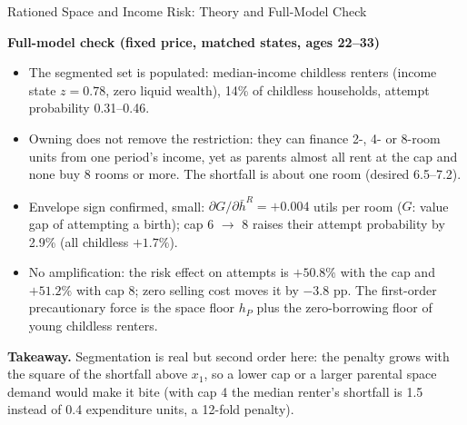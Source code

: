 \documentclass[11pt,aspectratio=169]{beamer}
\newcommand{\1}{\mathbf 1}
\newcommand{\takeaway}[1]{\vfill{\small\textbf{Takeaway.} #1}}
\begin{document}
\begin{frame}[t]{Rationed Space and Income Risk: Theory and Full-Model Check}
\begin{minipage}[t]{0.62\textwidth}
\vspace{0pt}
\scriptsize\setlength{\leftmargini}{1em}
\textbf{Full-model check (fixed price, matched states, ages 22--33)}
\begin{itemize}\setlength{\itemsep}{0.1em}\setlength{\parskip}{0pt}
\item The segmented set is populated: median-income childless renters (income state $z=0.78$, zero liquid wealth), 14\% of childless households, attempt probability 0.31--0.46.
\item Owning does not remove the restriction: they can finance 2-, 4- or 8-room units from one period's income, yet as parents almost all rent at the cap and none buy 8 rooms or more. The shortfall is about one room (desired 6.5--7.2).
\item Envelope sign confirmed, small: $\partial G/\partial \bar h^R = +0.004$ utils per room ($G$: value gap of attempting a birth); cap 6 $\to$ 8 raises their attempt probability by 2.9\% (all childless $+1.7\%$).
\item No amplification: the risk effect on attempts is $+50.8\%$ with the cap and $+51.2\%$ with cap 8; zero selling cost moves it by $-3.8$ pp. The first-order precautionary force is the space floor $h_P$ plus the zero-borrowing floor of young childless renters.
\end{itemize}
\end{minipage}

\takeaway{\scriptsize Segmentation is real but second order here: the penalty grows with the square of the shortfall above $x_1$, so a lower cap or a larger parental space demand would make it bite (with cap 4 the median renter's shortfall is 1.5 instead of 0.4 expenditure units, a 12-fold penalty).}
\end{frame}
\end{document}
